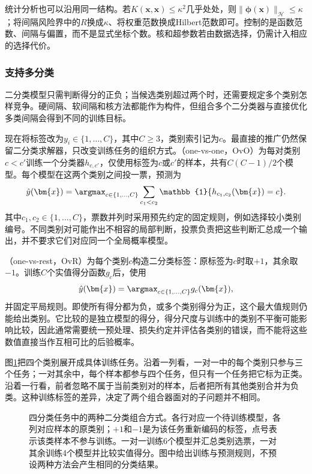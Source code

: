 统计分析也可以沿用同一结构。若$K(\bm{x},\bm{x})\le\kappa^2$几乎处处，则$\lVert\bm{\phi}(\bm{x})\rVert_{\mathcal{H}}\le\kappa$；将间隔风险界中的$R$换成$\kappa$、将权重范数换成Hilbert范数即可。控制的是函数范数、间隔与偏置，而不是显式坐标个数。核和超参数若由数据选择，仍需计入相应的选择代价。

\subsubsection{支持多分类}
\label{sec:classification-svm-multiclass}

二分类模型只需判断得分的正负；当候选类别超过两个时，还需要规定多个类别怎样竞争。硬间隔、软间隔和核方法都能作为构件，但组合多个二分类器与直接优化多类间隔会得到不同的训练目标。

现在将标签改为$y_i\in\{1,\ldots,C\}$，其中$C\ge3$，类别索引记为$c$。最直接的推广仍然保留二分类求解器，只改变训练任务的组织方式。（one-vs-one，OvO）为每对类别$c<c'$训练一个分类器$h_{c,c'}$，仅使用标签为$c$或$c'$的样本，共有$C(C-1)/2$个模型。每个模型在这两个类别之间投一票，预测为
\[
  \hat y(\bm{x})
  =\argmax_{c\in\{1,\ldots,C\}}
     \sum_{c_1<c_2}\mathbb{1}\{h_{c_1,c_2}(\bm{x})=c\}.
\]
其中$c_1,c_2\in\{1,\ldots,C\}$，票数并列时采用预先约定的固定规则，例如选择较小类别编号。不同类别对可能作出不相容的局部判断，投票负责把这些判断汇总成一个输出，并不要求它们对应同一个全局概率模型。

（one-vs-rest，OvR）为每个类别$c$构造二分类标签：原标签为$c$时取$+1$，其余取$-1$。训练$C$个实值得分函数$g_c$后，使用
\[
  \hat y(\bm{x})=\argmax_{c\in\{1,\ldots,C\}}g_c(\bm{x}),
\]
并固定平局规则。即使所有得分都为负，或多个类别得分为正，这个最大值规则仍能给出类别。它比较的是独立模型的得分，得分尺度与训练中的类别不平衡可能影响比较，因此通常需要统一预处理、损失约定并评估各类别的错误，而不能将这些数值直接当作互相可比的后验概率。

图\ref{fig:classification-svm-multiclass}把四个类别展开成具体训练任务。沿着一列看，一对一中的每个类别只参与三个任务；一对其余中，每个样本都参与四个任务，但只有一个任务把它标为正类。沿着一行看，前者忽略不属于当前类别对的样本，后者把所有其他类别合并为负类。这种训练标签的差异，决定了两个组合器面对的子问题并不相同。

\begin{figure}[htbp]
  \centering
  
  \caption{四分类任务中的两种二分类组合方式。各行对应一个待训练模型，各列对应样本的原类别；$+1$和$-1$是为该任务重新编码的标签，点号表示该类样本不参与训练。一对一训练6个模型并汇总类别选票，一对其余训练4个模型并比较实值得分。图中给出训练与预测规则，不预设两种方法会产生相同的分类结果。}
  \label{fig:classification-svm-multiclass}
\end{figure}


